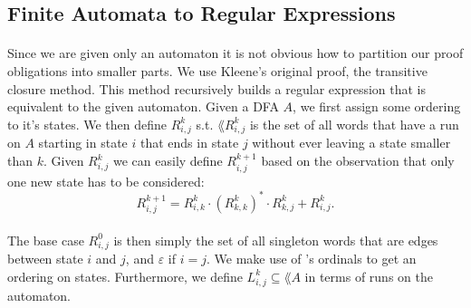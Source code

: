 \documentclass[11pt,a4paper,oneside]{book}
\begin{document}
            \subsection{Finite Automata to Regular Expressions}
                
                \paragraph{}
                    Since we are given only an automaton it is not obvious how to partition our proof obligations into smaller parts.
                    We use Kleene's original proof, the transitive closure method. 
                    This method recursively builds a regular expression that is equivalent to the given automaton.
                    Given a DFA $A$, we first assign some ordering to it's states. We then define $R^k_{i,j}$ s.t. 
                    $\lang{R^k_{i,j}}$ is the set of all words that have a run on $A$ starting in state $i$ that ends in state $j$ without ever leaving a state smaller than $k$. Given $R^k_{i,j}$ we can easily define $R^{k+1}_{i,j}$ based on the observation that only one new state has to be considered:
                    \[
                        R^{k+1}_{i,j} = R^{k}_{i,k} \cdot (R^{k}_{k,k})^* \cdot R^{k}_{k,j} + R^{k}_{i,j}.
                    \]
                    \paragraph{}
                        The base case $R^{0}_{i,j}$ is then simply the set of all singleton words that are edges between state $i$ and $j$, and $\varepsilon$ if $i=j$. 
                        We make use of \ssreflect's ordinals to get an ordering on states. 
                        Furthermore, we define $L^k_{i,j} \subseteq \lang{A}$ in terms of runs on the automaton. 
                        \vspace{-0.3cm} 
                    
\end{document}
